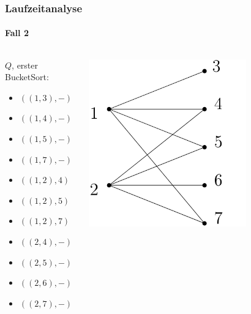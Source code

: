 \begin{frame}[t]
\frametitle{Laufzeitanalyse}
\framesubtitle{Fall 2}

\begin{columns}
	\begin{block}{$Q$, erster BucketSort:}
		\begin{itemize}
			\item $((1,3), -)$
			\item $((1,4), -)$
			\item $((1,5), -)$
			\item $((1,7), -)$
			\item $((1,2), 4)$
			\item $((1,2), 5)$
			\item $((1,2), 7)$
			\item $((2,4), -)$
			\item $((2,5), -)$
			\item $((2,6), -)$
			\item $((2,7), -)$
		\end{itemize}
	\end{block}
	
	\includegraphics[width=0.7\textwidth]{images/Graph_Queue_1.png}
\end{columns}
\end{frame}


